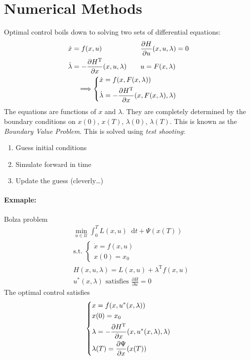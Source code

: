 \documentclass[letterpaper,12pt,titlepage]{report}
\newcommand*\dif{\mathop{}\!\mathrm{d}}
\newcommand{\trans}{^\text{T}}
\newcommand*\pder[2]{\frac{\partial #1}{\partial #2}}
\theoremstyle{plain}
\theoremstyle{definition}
\begin{document}
\section{Numerical Methods}
Optimal control boils down to solving two sets of differential equations:
\begin{gather}
  \begin{aligned}
    \dot x &= f(x,u) & \quad & \pder{H}{u}(x,u,\lambda) = 0 \\
    \dot\lambda &= -\pder{H\trans}{x}(x,u,\lambda) && u = F(x,\lambda) \\
  \end{aligned} \\
  \Longrightarrow \begin{dcases}
    \dot x = f(x,F(x,\lambda)) \\
    \dot \lambda = -\pder{H\trans}{x}(x,F(x,\lambda),\lambda)
  \end{dcases}
\end{gather}
The equations are functions of $x$ and $\lambda$. They are completely determined by the boundary conditions on $x(0)$, $x(T)$, $\lambda(0)$, $\lambda(T)$. This is known as the \emph{Boundary Value Problem}. This is solved using \emph{test shooting}:
\begin{enumerate}
\item Guess initial conditions
\item Simulate forward in time
\item Update the guess (cleverly\dots)
\end{enumerate}

\paragraph{Exmaple:} Bolza problem
\begin{align}
  & \min_{u\in\mathcal U} \int_0^T L(x,u)\dif t + \Psi(x(T)) \\
  & \text{s.t. } \begin{cases}
    \dot x=f(x,u) \\
    x(0) = x_0
  \end{cases} \\
  & H(x,u,\lambda) = L(x,u) + \lambda\trans f(x,u) \\
  & u^* (x,\lambda) \text{ satisfies } \pder{H}{u} = 0
\end{align}
The optimal control satisfies
\begin{gather}
  \begin{dcases}
    x = f(x,u^*(x,\lambda)) \\
    x(0) = x_0 \\
    \lambda = -\pder{H\trans}{x} (x,u^*(x,\lambda),\lambda) \\
    \lambda(T) = \pder{\Psi}{x}(x(T))
  \end{dcases}
\end{gather}
\end{document}

